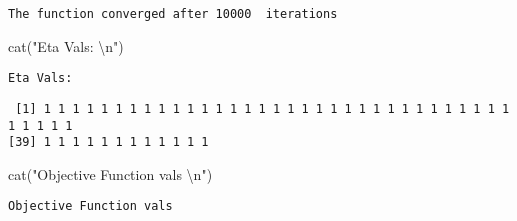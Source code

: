\documentclass[
  letterpaper,
  DIV=11,
  numbers=noendperiod]{scrartcl}
\newenvironment{Shaded}{\begin{snugshade}}{\end{snugshade}}
\newcommand{\DecValTok}[1]{\textcolor[rgb]{0.68,0.00,0.00}{#1}}
\newcommand{\FunctionTok}[1]{\textcolor[rgb]{0.28,0.35,0.67}{#1}}
\newcommand{\NormalTok}[1]{\textcolor[rgb]{0.00,0.23,0.31}{#1}}
\newcommand{\SpecialCharTok}[1]{\textcolor[rgb]{0.37,0.37,0.37}{#1}}
\newcommand{\StringTok}[1]{\textcolor[rgb]{0.13,0.47,0.30}{#1}}
\begin{document}
\begin{Shaded}
\end{Shaded}

\begin{verbatim}
The function converged after 10000  iterations 
\end{verbatim}

\begin{Shaded}
\begin{Highlighting}[]
\FunctionTok{cat}\NormalTok{(}\StringTok{"Eta Vals: }\SpecialCharTok{\textbackslash{}n}\StringTok{"}\NormalTok{)}
\end{Highlighting}
\end{Shaded}

\begin{verbatim}
Eta Vals: 
\end{verbatim}

\begin{Shaded}
\end{Shaded}

\begin{verbatim}
 [1] 1 1 1 1 1 1 1 1 1 1 1 1 1 1 1 1 1 1 1 1 1 1 1 1 1 1 1 1 1 1 1 1 1 1 1 1 1 1
[39] 1 1 1 1 1 1 1 1 1 1 1 1
\end{verbatim}

\begin{Shaded}
\begin{Highlighting}[]
\FunctionTok{cat}\NormalTok{(}\StringTok{"Objective Function vals }\SpecialCharTok{\textbackslash{}n}\StringTok{"}\NormalTok{)}
\end{Highlighting}
\end{Shaded}

\begin{verbatim}
Objective Function vals 
\end{verbatim}

\begin{Shaded}
\end{Shaded}
\end{document}
